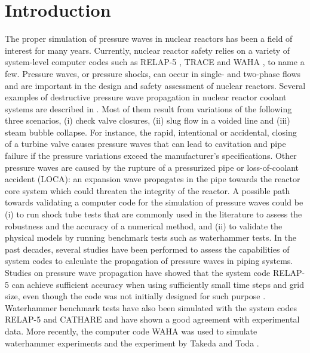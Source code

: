 \documentclass{inputs/mc2015}
\begin{document}
\section{Introduction}\label{sec:intro}
%
%
The proper simulation of pressure waves in nuclear reactors has been a field of interest for many years. Currently, nuclear reactor safety relies on a variety of system-level computer codes such as RELAP-5 \cite{relap5}, TRACE \cite{trace} and WAHA \cite{waha-manual}, to name a few. Pressure waves, or pressure shocks, can occur in single- and two-phase flows and are important in the design and safety assessment of nuclear reactors. Several examples of destructive pressure wave propagation in nuclear reactor coolant systems are described in \cite{watkins-berry-1979}. Most of them result from variations of the following three scenarios, (i) check valve closures, (ii) slug flow in a voided line and (iii) steam bubble collapse. For instance, the rapid, intentional or accidental, closing of a turbine valve causes pressure waves that can lead to cavitation and pipe failure if the pressure variations exceed the manufacturer's specifications. Other pressure waves are caused by the rupture of a pressurized pipe or loss-of-coolant accident (LOCA): an expansion wave propagates in the pipe towards the reactor core system which could threaten the integrity of the reactor. A possible path towards validating a computer code for the simulation of pressure waves could be (i) to run shock tube tests that are commonly used in the literature to assess the robustness and the accuracy of a numerical method, and (ii) to validate the physical models by running benchmark tests such as waterhammer tests. In the past decades, several studies have been performed to assess the capabilities of system codes to calculate the propagation of pressure waves in piping systems. Studies on pressure wave propagation have showed that the system code RELAP-5 can achieve sufficient accuracy when using sufficiently small time steps and grid size, even though the code was not initially designed for such purpose \cite{tiselji-gale}. Waterhammer benchmark tests have also been simulated with the system codes RELAP-5 \cite{Serre-bestion, bestion-serre-2012, Sokolowski-Koszela} and CATHARE \cite{cathare} and have shown a good agreement with experimental data. More recently, the computer code WAHA was used to simulate waterhammer experiments \cite{waha} and the experiment by Takeda and Toda \cite{costa-tiselji}. 
\end{document}
